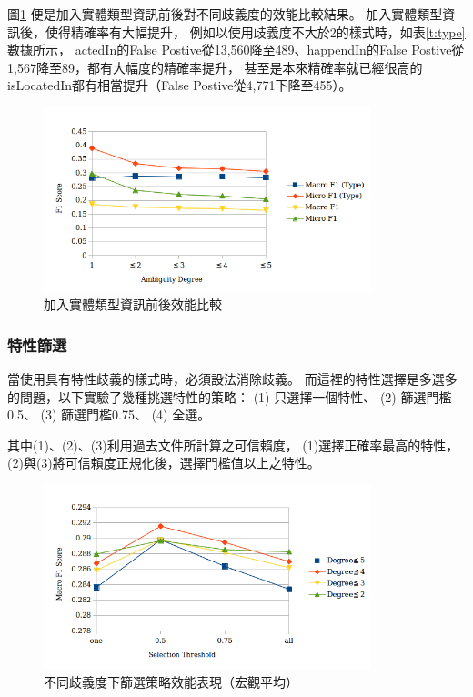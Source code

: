 圖\ref{i:type} 便是加入實體類型資訊前後對不同歧義度的效能比較結果。
加入實體類型資訊後，使得精確率有大幅提升，
例如以使用歧義度不大於2的樣式時，如表\ref{t:type} 數據所示，
actedIn的False Postive從13,560降至489、happendIn的False Postive從1,567降至89，都有大幅度的精確率提升，
甚至是本來精確率就已經很高的isLocatedIn都有相當提升（False Postive從4,771下降至455）。

\begin{figure}[h]
    \centering
    \includegraphics[width=0.85\textwidth]{images/04-type}
    \caption{加入實體類型資訊前後效能比較}
    \label{i:type}
\end{figure}



\subsubsection{特性篩選}
當使用具有特性歧義的樣式時，必須設法消除歧義。
而這裡的特性選擇是多選多的問題，以下實驗了幾種挑選特性的策略：
(1) 只選擇一個特性、 (2) 篩選門檻0.5、 (3) 篩選門檻0.75、 (4) 全選。

其中(1)、(2)、(3)利用過去文件所計算之可信賴度，
(1)選擇正確率最高的特性，
(2)與(3)將可信賴度正規化後，選擇門檻值以上之特性。

\begin{figure}[h]
    \centering
    \includegraphics[width=0.85\textwidth]{images/04-macro-nol}
    \caption{不同歧義度下篩選策略效能表現（宏觀平均）}
    \label{i:macro-nol}
\end{figure}

